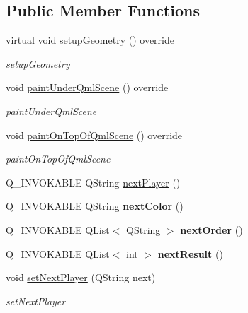 \subsection*{Public Member Functions}
\begin{DoxyCompactItemize}
\item 
virtual void \mbox{\hyperlink{class_my_gl_item_a27704a445b6915b4f365193bf0cab618}{setup\+Geometry}} () override
\begin{DoxyCompactList}\small\item\em setup\+Geometry \end{DoxyCompactList}\item 
void \mbox{\hyperlink{class_my_gl_item_a46ffc33e9892262f9d1d88c14fa0e092}{paint\+Under\+Qml\+Scene}} () override
\begin{DoxyCompactList}\small\item\em paint\+Under\+Qml\+Scene \end{DoxyCompactList}\item 
void \mbox{\hyperlink{class_my_gl_item_ad9f060b5a805367e0fbf065e9318c0b1}{paint\+On\+Top\+Of\+Qml\+Scene}} () override
\begin{DoxyCompactList}\small\item\em paint\+On\+Top\+Of\+Qml\+Scene \end{DoxyCompactList}\item 
Q\+\_\+\+I\+N\+V\+O\+K\+A\+B\+LE Q\+String \mbox{\hyperlink{class_my_gl_item_a52e7f492f9ddbbd17868c059282ca397}{next\+Player}} ()
\item 
\mbox{\label{class_my_gl_item_abb8dd90d60abac1e9a0773231831f84f}} 
Q\+\_\+\+I\+N\+V\+O\+K\+A\+B\+LE Q\+String {\bfseries next\+Color} ()
\item 
\mbox{\label{class_my_gl_item_ae10ea67700065435027f137885ce0774}} 
Q\+\_\+\+I\+N\+V\+O\+K\+A\+B\+LE Q\+List$<$ Q\+String $>$ {\bfseries next\+Order} ()
\item 
\mbox{\label{class_my_gl_item_aed7a1092db78fdcfbd839105b700fbc3}} 
Q\+\_\+\+I\+N\+V\+O\+K\+A\+B\+LE Q\+List$<$ int $>$ {\bfseries next\+Result} ()
\item 
void \mbox{\hyperlink{class_my_gl_item_a17b24c5af31fe0fed3ca7253c59fd7ee}{set\+Next\+Player}} (Q\+String next)
\begin{DoxyCompactList}\small\item\em set\+Next\+Player \end{DoxyCompactList}\item 

\end{DoxyCompactItemize}

